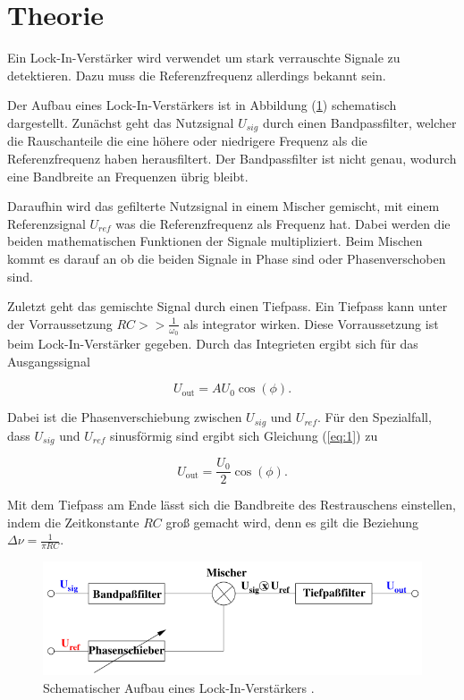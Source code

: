 \section{Theorie}

Ein Lock-In-Verstärker wird verwendet um stark verrauschte Signale zu detektieren.
Dazu muss die Referenzfrequenz allerdings bekannt sein.

Der Aufbau eines Lock-In-Verstärkers ist in Abbildung (\ref{abb:1}) schematisch
dargestellt. Zunächst geht das Nutzsignal $U_{sig}$ durch einen Bandpassfilter,
welcher die Rauschanteile die eine höhere oder niedrigere Frequenz als die
Referenzfrequenz haben herausfiltert. Der Bandpassfilter ist nicht genau, wodurch
eine Bandbreite an Frequenzen übrig bleibt.

Daraufhin wird das gefilterte Nutzsignal in einem Mischer gemischt, mit einem
Referenzsignal $U_{ref}$ was die Referenzfrequenz als Frequenz hat. Dabei werden
die beiden mathematischen Funktionen der Signale multipliziert. Beim Mischen kommt
es darauf an ob die beiden Signale in Phase sind oder Phasenverschoben sind.

Zuletzt geht das gemischte Signal durch einen Tiefpass. Ein Tiefpass kann unter der
Vorraussetzung $RC >> \frac{1}{\omega_0}$ als integrator wirken. Diese Vorraussetzung ist
beim Lock-In-Verstärker gegeben. Durch das Integrieten ergibt sich für das Ausgangssignal

\begin{equation}
  U_{\text{out}} = A U_0 \cos(\phi).
  \label{eq:1}
\end{equation}

Dabei ist \phi die Phasenverschiebung zwischen $U_{sig}$ und $U_{ref}$. Für den
Spezialfall, dass $U_{sig}$ und $U_{ref}$ sinusförmig sind ergibt sich Gleichung
(\ref{eq:1}) zu

\begin{equation*}
  U_{\text{out}} =  \frac{U_0}{2} \cos(\phi).
\end{equation*}

Mit dem Tiefpass am Ende lässt sich die Bandbreite des Restrauschens einstellen, indem
die Zeitkonstante $RC$ groß gemacht wird, denn es gilt die Beziehung $\Delta \nu = \frac{1}{\pi RC}$.

\begin{figure}[H]
  \centering
  \includegraphics[width=\textwidth]{Skizze.png}
  \caption{Schematischer Aufbau eines Lock-In-Verstärkers \cite{1}.}
  \label{abb:1}
\end{figure}
